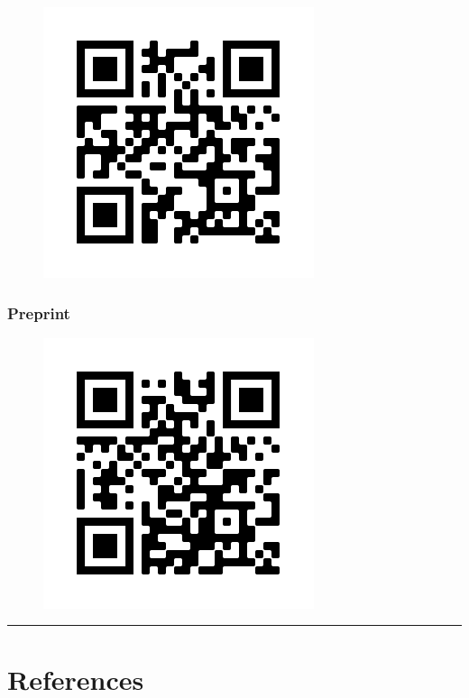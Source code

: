 \documentclass[]{book}
\begin{document}
\begin{figure}
\centering
\includegraphics{images/qual_preregistration_QR.png}
\caption{}
\end{figure}

\hypertarget{preprint}{%
\subsection{Preprint}\label{preprint}}

\begin{figure}
\centering
\includegraphics{images/qual_preprint_QR.png}
\caption{}
\end{figure}

\begin{center}\rule{0.5\linewidth}{0.5pt}\end{center}

\hypertarget{references}{%
\chapter{References}\label{references}}
\end{document}
